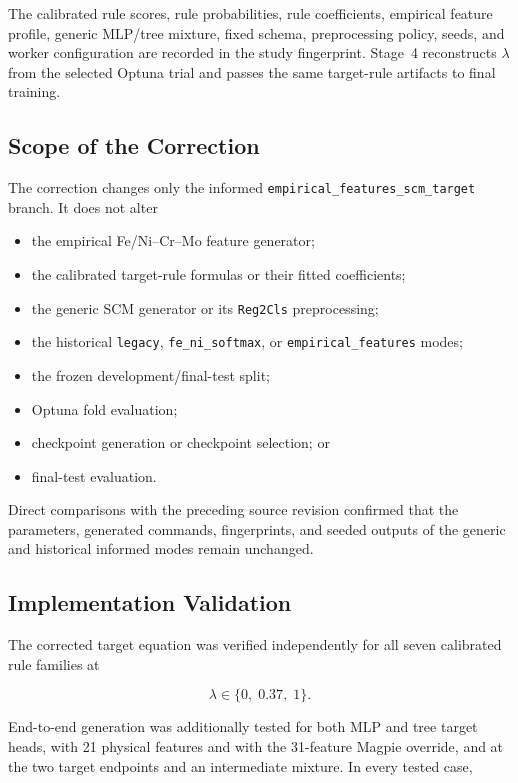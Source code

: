\documentclass{article}
\begin{document}
The calibrated rule scores, rule probabilities, rule coefficients, empirical
feature profile, generic MLP/tree mixture, fixed schema, preprocessing policy,
seeds, and worker configuration are recorded in the study fingerprint.
Stage~4 reconstructs \(\lambda\) from the selected Optuna trial and passes the
same target-rule artifacts to final training.

\subsection{Scope of the Correction}

The correction changes only the informed
\texttt{empirical\_features\_scm\_target} branch. It does not alter

\begin{itemize}
    \item the empirical Fe/Ni--Cr--Mo feature generator;
    \item the calibrated target-rule formulas or their fitted coefficients;
    \item the generic SCM generator or its \texttt{Reg2Cls} preprocessing;
    \item the historical \texttt{legacy},
    \texttt{fe\_ni\_softmax}, or
    \texttt{empirical\_features} modes;
    \item the frozen development/final-test split;
    \item Optuna fold evaluation;
    \item checkpoint generation or checkpoint selection; or
    \item final-test evaluation.
\end{itemize}

Direct comparisons with the preceding source revision confirmed that the
parameters, generated commands, fingerprints, and seeded outputs of the
generic and historical informed modes remain unchanged.

\subsection{Implementation Validation}

The corrected target equation was verified independently for all seven
calibrated rule families at

\[
\lambda\in\{0,\;0.37,\;1\}.
\]

End-to-end generation was additionally tested for both MLP and tree target
heads, with 21 physical features and with the 31-feature Magpie override, and
at the two target endpoints and an intermediate mixture. In every tested case,
\end{document}
